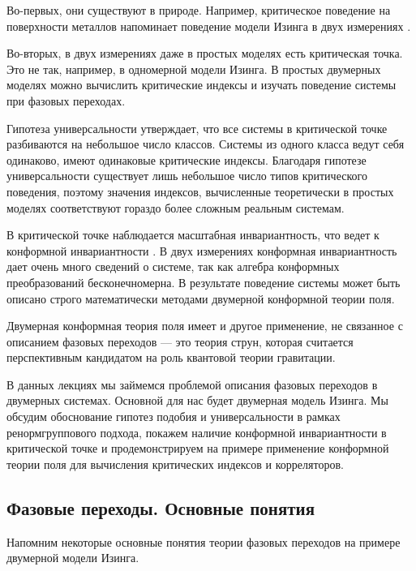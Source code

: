 \documentclass[a4paper,12pt]{article}
\theoremstyle{definition}
\theoremstyle{definition}
\theoremstyle{definition}
\begin{document}
Во-первых, они существуют в природе. Например, критическое поведение на поверхности металлов
напоминает поведение модели Изинга в двух измерениях \cite{campuzano1985110}.

Во-вторых, в двух измерениях даже в простых моделях есть критическая точка. Это не так, например, в
одномерной модели Изинга. В простых двумерных моделях можно вычислить критические индексы и изучать
поведение системы при фазовых переходах.

Гипотеза универсальности утверждает, что все системы в критической точке разбиваются на небольшое
число классов. Системы из одного класса ведут себя одинаково, имеют одинаковые критические индексы.
Благодаря гипотезе универсальности существует лишь небольшое число типов критического поведения,
поэтому значения индексов, вычисленные теоретически в простых моделях соответствуют гораздо более
сложным реальным системам.

В критической точке наблюдается масштабная инвариантность, что ведет к конформной инвариантности
\cite{Polyakov:1970xd}. В двух измерениях конформная инвариантность дает очень много сведений о
системе, так как алгебра конформных преобразований бесконечномерна. В результате поведение системы
может быть описано строго математически методами двумерной конформной теории поля.

Двумерная конформная теория поля имеет и другое применение, не связанное с описанием фазовых
переходов --- это теория струн, которая считается перспективным кандидатом на роль квантовой теории
гравитации.

В данных лекциях мы займемся проблемой описания фазовых переходов в двумерных системах. Основной для
нас будет двумерная модель Изинга. Мы обсудим обоснование гипотез подобия и универсальности в рамках
ренормгруппового подхода, покажем наличие конформной инвариантности в критической точке и
продемонстрируем на примере применение конформной теории поля для вычисления критических индексов и
корреляторов.

\subsection{Фазовые переходы. Основные понятия}
\label{sec:phase-transitions}

Напомним некоторые основные понятия теории фазовых переходов на примере двумерной модели Изинга.
\end{document}
